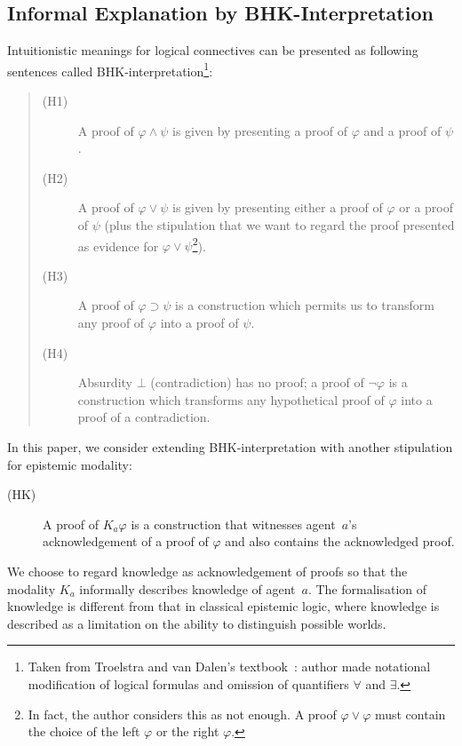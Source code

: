 \subsection{Informal Explanation by BHK-Interpretation}
\label{bhk}

Intuitionistic meanings for logical connectives
can be presented as 
following sentences called BHK-interpretation\footnote{
Taken from Troelstra and van Dalen's textbook~\cite[Ch.~1]{troelstra1988constructivism}:
author made notational modification of logical formulas and omission of
quantifiers $\forall$ and $\exists$.
}:
\begin{quotation}
\noindent
\begin{description}
 \item[(H1)] A proof of $\varphi\wedge \psi$ is given by presenting a proof of $\varphi$
	    and a proof of $\psi$.
 \item[(H2)] A proof of $\varphi\vee\psi$ is given by presenting either a proof of
	    $\varphi$ or a proof of $\psi$ (plus the stipulation that we want to regard
	    the proof presented as evidence for $\varphi\vee\psi$\footnote{In fact, the
	    author considers this as not enough. A proof $\varphi\vee\varphi$ must contain
	    the choice of the left $\varphi$ or the right $\varphi$.}).
 \item[(H3)] A proof of $\varphi\supset\psi$ is a construction which permits us to
	    transform any proof of $\varphi$ into a proof of $\psi$.
 \item[(H4)] Absurdity $\bot$ (contradiction) has no proof; a proof of $\neg \varphi$ is a
	    construction which transforms any hypothetical proof of $\varphi$ into a proof
	    of a contradiction.
\end{description}
\end{quotation}
In this paper, we consider extending BHK-interpretation with another stipulation for
epistemic modality:
\begin{description}
 \item[(HK)] A proof of $K_a\varphi$ is a construction that witnesses agent~$a$'s
	    acknowledgement of a proof of $\varphi$ and also contains the acknowledged
	    proof.
\end{description}
We choose to regard knowledge as acknowledgement of proofs so that the modality $K_a$ informally
describes knowledge of agent~$a$.
The formalisation of knowledge is different from that in classical epistemic logic, where
knowledge is described as a limitation on the ability to distinguish possible worlds.

